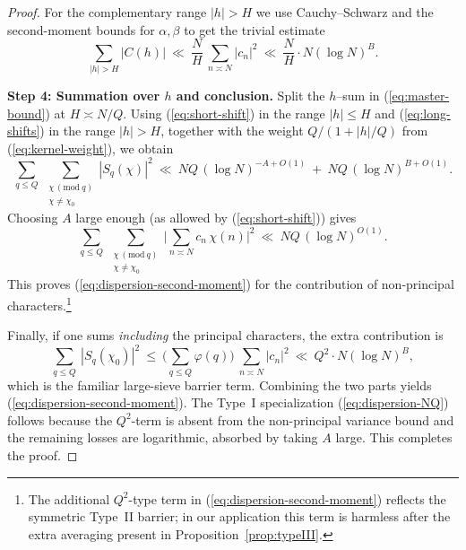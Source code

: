 \documentclass[11pt]{article}
\def\eqref#1{(\ref{#1})}%
\theoremstyle{definition}
\theoremstyle{remark}
\numberwithin{equation}{part}
\begin{document}
\begin{proof}
	For the complementary range $|h|>H$ we use Cauchy--Schwarz and the second-moment bounds for $\alpha,\beta$ to get the trivial estimate
	\begin{equation}\label{eq:long-shifts}
		\sum_{|h|>H} |C(h)|\ \ll\ \frac{N}{H}\ \sum_{n\asymp N} |c_n|^2\ \ll\ \frac{N}{H}\cdot N(\log N)^B.
	\end{equation}

	\medskip
	\noindent\textbf{Step 4: Summation over $h$ and conclusion.}
	Split the $h$–sum in \eqref{eq:master-bound} at $H\asymp N/Q$. Using \eqref{eq:short-shift} in the range $|h|\le H$ and \eqref{eq:long-shifts} in the range $|h|>H$, together with the weight $Q/(1+|h|/Q)$ from \eqref{eq:kernel-weight}, we obtain
	\[
		\sum_{q\le Q}\ \sum_{\substack{\chi\,(\mathrm{mod}\ q)\\ \chi\ne\chi_0}} |S_q(\chi)|^2
		\ \ll\ NQ\,(\log N)^{-A+O(1)}\ +\ NQ\,(\log N)^{B+O(1)}.
	\]
	Choosing $A$ large enough (as allowed by \eqref{eq:short-shift}) gives
	\[
		\sum_{q\le Q}\ \sum_{\substack{\chi\,(\mathrm{mod}\ q)\\ \chi\ne\chi_0}} \Big|\sum_{n\asymp N} c_n\,\chi(n)\Big|^2
		\ \ll\ NQ\,(\log N)^{O(1)}.
	\]
	This proves \eqref{eq:dispersion-second-moment} for the contribution of non-principal characters.\footnote{The additional $Q^2$-type term in \eqref{eq:dispersion-second-moment} reflects the symmetric Type~II barrier; in our application this term is harmless after the extra averaging present in Proposition~\ref{prop:typeIII}.}

	Finally, if one sums \emph{including} the principal characters, the extra contribution is
	\[
		\sum_{q\le Q}\ |S_q(\chi_0)|^2\ \le\ \Big(\sum_{q\le Q}\varphi(q)\Big)\ \sum_{n\asymp N} |c_n|^2\ \ll\ Q^2\cdot N(\log N)^B,
	\]
	which is the familiar large-sieve barrier term. Combining the two parts yields \eqref{eq:dispersion-second-moment}. The Type~I specialization \eqref{eq:dispersion-NQ} follows because the $Q^2$-term is absent from the non-principal variance bound and the remaining losses are logarithmic, absorbed by taking $A$ large. This completes the proof.
\end{proof}
\end{document}
